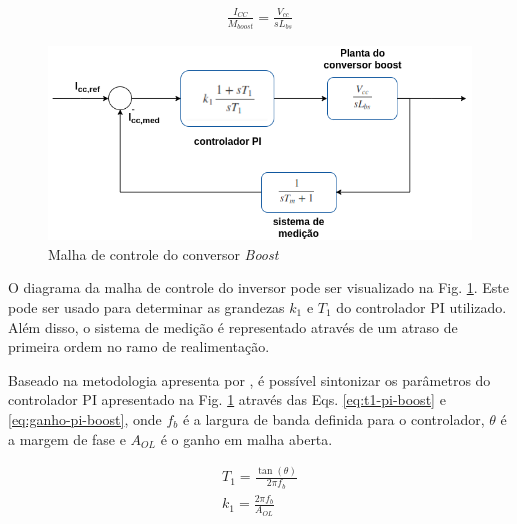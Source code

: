 \begin{align}
	\frac{I_{CC}}{M_{boost}} = \frac{V_{cc}}{sL_{bs}}\label{eq:func-trans-pi}
\end{align}

\begin{figure}[!hbt]
	\begin{center}
		\includegraphics[scale=0.50]{figuras/pi_boost.png}
		\caption{Malha de controle do conversor \textit{Boost}}
		\label{fig:pi-boost}
	\end{center}
\end{figure}

O diagrama da malha de controle do inversor pode ser visualizado na Fig. \ref{fig:pi-boost}.
Este pode ser usado para determinar as grandezas $k_1$ e $T_1$ do controlador PI utilizado. 
Além disso, o sistema de medição é representado através de um atraso de primeira ordem no 
ramo de realimentação.

Baseado na metodologia apresenta por \cite{Saleh2012}, é possível sintonizar os parâmetros do controlador PI
apresentado na Fig. \ref{fig:pi-boost} através das Eqs. \ref{eq:t1-pi-boost} e \ref{eq:ganho-pi-boost}, 
onde $f_b$ é a largura de banda definida para o controlador, $\theta$ é a margem de fase e $A_{OL}$ é o ganho 
em malha aberta.

\begin{align}
	T_1 = \frac{\tan(\theta)}{2\pi f_b}\label{eq:t1-pi-boost}\\
	k_1 = \frac{2\pi f_b}{A_{OL}}\label{eq:ganho-pi-boost}
\end{align}